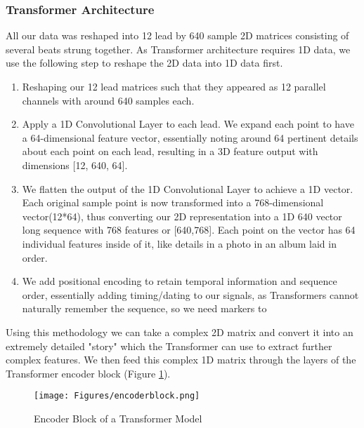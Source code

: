 \documentclass[
	a4paper, 
	10pt, 
	twoside, 
]{LTJournalArticle}
\begin{document}
\subsubsection{Transformer Architecture}
All our data was reshaped into 12 lead by 640 sample 2D matrices consisting of several beats strung together. As Transformer architecture requires 1D data, we use the following step to reshape the 2D data into 1D data first.
\begin{enumerate}
    \item Reshaping our 12 lead matrices such that they appeared as 12 parallel channels with around 640 samples each. 
    \item Apply a 1D Convolutional Layer to each lead. We expand each point to have a 64-dimensional feature vector, essentially noting around 64 pertinent details about each point on each lead, resulting in a 3D feature output with dimensions [12, 640, 64].
    \item We flatten the output of the 1D Convolutional Layer to achieve a 1D vector. Each original sample point is now transformed into a 768-dimensional vector(12*64), thus converting our 2D representation into a 1D 640 vector long sequence with 768 features or [640,768]. Each point on the vector has 64 individual features inside of it, like details in a photo in an album laid in order.
    \item We add positional encoding to retain temporal information and sequence order, essentially adding timing/dating to our signals, as Transformers cannot naturally remember the sequence, so we need markers to 
\end{enumerate}
Using this methodology we can take a complex 2D matrix and convert it into an extremely detailed "story" which the Transformer can use to extract further complex features. We then feed this complex 1D matrix through the layers of the Transformer encoder block (Figure \ref{fig:encoderblock}). \\
\begin{figure} [!h]
    \centering
    \texttt{[image: Figures/encoderblock.png]}
    \caption{Encoder Block of a Transformer Model}
    \label{fig:encoderblock}
\end{figure}
\end{document}

